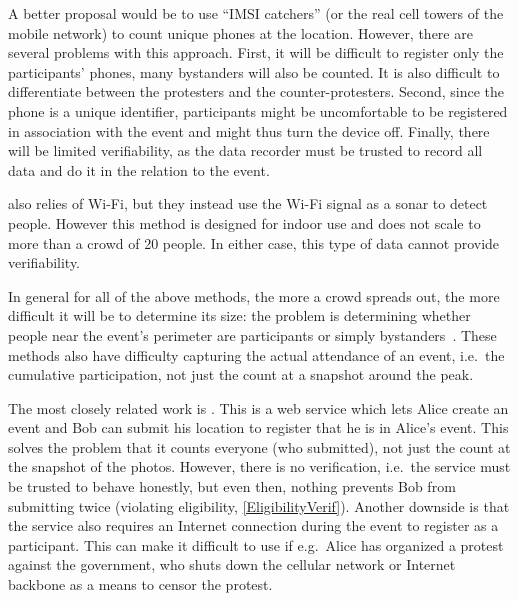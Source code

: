 A better proposal would be to use \enquote{IMSI catchers} (or the real cell 
towers of the mobile network) to count unique phones at the location.
However, there are several problems with this approach.
First, it will be difficult to register only the participants' phones, many 
bystanders will also be counted.
It is also difficult to differentiate between the protesters and the 
counter-protesters.
Second, since the phone is a unique identifier, participants might be 
uncomfortable to be registered in association with the event and might thus 
turn the device off.
Finally, there will be limited verifiability, as the data recorder must be 
trusted to record all data and do it in the relation to the event.

 also relies of Wi-Fi, but they instead use the Wi-Fi 
signal as a sonar to detect people.
However this method is designed for indoor use and does not scale to more than 
a crowd of 20 people.
In either case, this type of data cannot provide verifiability.

In general for all of the above methods, the more a crowd spreads out, the more
difficult it will be to determine its size:
the problem is determining whether people near the event's perimeter are 
participants or simply bystanders~\cite{HowToEstimateCrowdSize}.
These methods also have difficulty capturing the actual attendance of an event,
i.e.\ the cumulative participation, not just the count at a snapshot around the 
peak.

The most closely related work is \citet{CrowdCount}.
This is a web service which lets Alice create an event and Bob can submit his 
location to register that he is in Alice's event.
This solves the problem that it counts everyone (who submitted), not just the 
count at the snapshot of the photos.
However, there is no verification, i.e.\ the service must be trusted to behave 
honestly, but even then, nothing prevents Bob from submitting twice (violating 
eligibility, \cref{EligibilityVerif}).
Another downside is that the service also requires an Internet connection 
during the event to register as a participant.
This can make it difficult to use if e.g.\ Alice has organized a protest 
against the government, who shuts down the cellular network or Internet 
backbone as a means to censor the protest.

